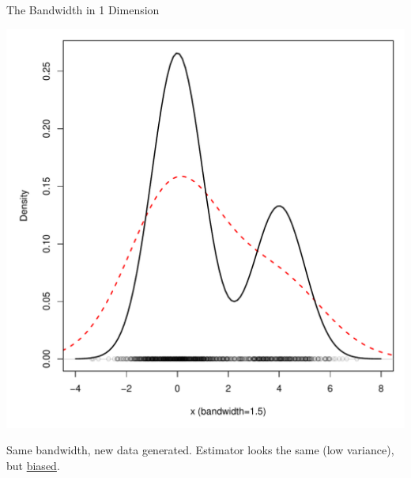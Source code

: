 \documentclass[12pt]{beamer}
\begin{document}
\begin{frame}{The Bandwidth in 1 Dimension}


  \begin{center}
    \includegraphics[scale=0.4]{figs/density3_2.pdf}
    \end{center}

\vspace{-.2in}

\begin{center}
  Same bandwidth, new data generated. Estimator looks the same (low variance), but \underline{biased}.
\end{center}

  
  
\end{frame}
\end{document}
